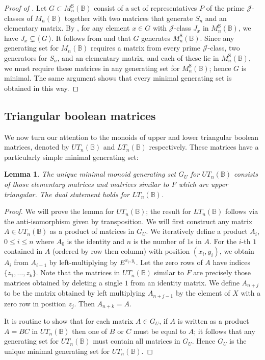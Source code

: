 \documentclass[11pt]{article}
\newtheorem{lemma}[thm]{Lemma}
\numberwithin{equation}{section}
\newcommand{\genset}[1]{\ensuremath{\langle\: #1 \:\rangle}}
\newcommand{\B}{\mathbb{B}}
\newcommand{\Bn}{M_n(\B)}
\newcommand{\Halln}{M_n^{\text{S}}(\B)}
\newcommand{\UTn}{UT_n(\B)}
\newcommand{\LTn}{LT_n(\B)}
\newcommand{\J}{\mathscr{J}}
\begin{document}
\begin{proof}[Proof of ]
  Let $G \subset \Halln$ consist of a set of representatives $P$ of the prime
  $\J$-classes of $\Bn$ together with two matrices that generate $S_n$ and an
  elementary matrix. By , for any element $x \in G$ with
  $\J$-class $J_x$ in $\Halln$, we have $J_x \subsetneq \genset{G}$. It
  follows from  and 
  that $G$ generates $\Halln$. Since any generating set for $\Bn$ requires a
  matrix from every prime $\J$-class, two generators for $S_n$, and an
  elementary matrix, and each of these lie in $\Halln$, we must require these
  matrices in any generating set for $\Halln$; hence $G$ is minimal. The same
  argument shows that every minimal generating set is obtained in this way.
\end{proof}

\subsection{Triangular boolean matrices}
\label{sec:TriBoolMat}
We now turn our attention to the monoids of upper and lower triangular boolean
matrices, denoted by $\UTn$ and $\LTn$ respectively. These matrices have a
particularly simple minimal generating set:

\begin{lemma}
  The unique minimal monoid generating set $G_U$ for $\UTn$ consists of those
  elementary matrices and matrices similar to $F$ which are upper triangular.
  The dual statement holds for $\LTn$.
\end{lemma}

\begin{proof}
  We will prove the lemma for $\UTn$; the result for $\LTn$ follows via the
  anti-isomorphism given by transposition.
  We will first construct any matrix $A \in \UTn$ as a product of matrices in
  $G_U$. We iteratively define a product $A_i$, $0 \leq i \leq n$ where $A_0$ is
  the identity and $n$ is the number of $1$s in $A$. For the $i$-th $1$
  contained in $A$ (ordered by row then column) with position $(x_i, y_i)$, we
  obtain $A_i$ from $A_{i - 1}$ by left-multiplying by $E^{x_i, y_i}$. Let the
  zero rows of $A$ have indices $\{z_1, \ldots, z_{k}\}$. Note that the matrices
  in $\UTn$ similar to $F$ are precisely those matrices obtained by deleting a
  single $1$ from an identity matrix. We define $A_{n + j}$ to be the matrix
  obtained by left multiplying $A_{n + j - 1}$ by the element of $X$ with a zero
  row in position $z_j$. Then $A_{n + k} = A$.  
  
  It is routine to show that for each matrix $A \in G_U$, if $A$ is written as
  a product $A = BC$ in $\UTn$ then one of $B$ or $C$ must be equal to $A$; it
  follows that any generating set for $\UTn$ must contain all matrices in $G_U$.
  Hence $G_U$ is the unique minimal generating set for $\UTn$.
\end{proof}
\end{document}
